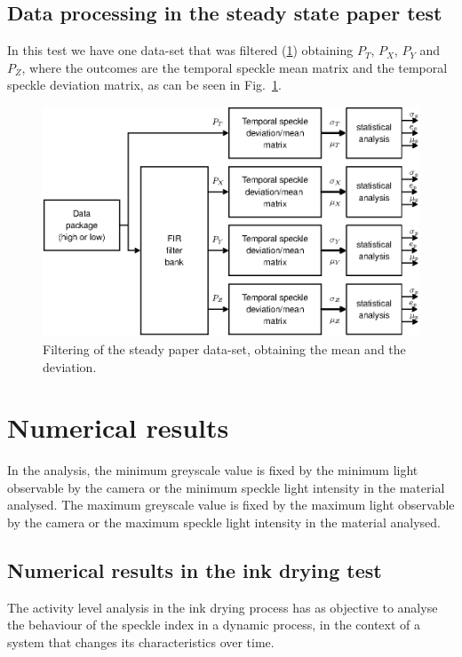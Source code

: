 \documentclass[review]{elsarticle}
\begin{document}
\subsection{Data processing in the steady state paper test}
\label{subsec:numprocink}

In this test we have one data-set that was filtered (\ref{fig:filtering2}) 
obtaining $P_T$, $P_X$, $P_Y$ and $P_Z$, where the outcomes are the temporal speckle mean matrix and the 
temporal speckle deviation matrix, as can be seen in Fig.~\ref{fig:filtering2}.

\begin{figure}[h!]
\centering
\includegraphics[width=0.65\columnwidth]{filtering2.eps}
\caption{Filtering of the steady paper data-set, obtaining the mean and the deviation.}
\label{fig:filtering2}
\end{figure}

\section{Numerical results} 
\label{sec:numerical}

In the analysis, the minimum greyscale value 
is fixed by the minimum light observable by the camera or the minimum speckle light intensity in the material analysed.
The maximum greyscale value
is fixed by the maximum light observable by the camera or the maximum speckle light intensity in the material analysed.

\subsection{Numerical results in the ink drying test} 
\label{subsec:numericalink}

The activity level analysis in the ink drying process has as objective to analyse 
the behaviour of the speckle index in a  dynamic process,
in the context of a system that changes its characteristics over time.
\end{document}
